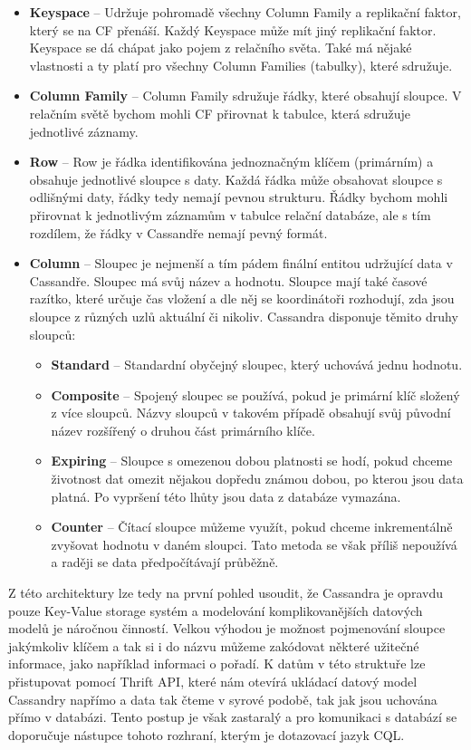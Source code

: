 \begin{itemize}
\item \textbf{Keyspace} – Udržuje pohromadě všechny Column Family a replikační faktor, který se na CF přenáší. Každý Keyspace může mít jiný replikační faktor. Keyspace se dá chápat jako pojem  z relačního světa. Také má nějaké vlastnosti a ty platí pro všechny Column Families (tabulky), které sdružuje.
\item \textbf{Column Family} – Column Family sdružuje řádky, které obsahují sloupce. V relačním světě bychom mohli CF přirovnat k tabulce, která sdružuje jednotlivé záznamy. 
\item \textbf{Row} – Row je řádka identifikována jednoznačným klíčem (primárním) a obsahuje jednotlivé sloupce s daty. Každá řádka může obsahovat sloupce s odlišnými daty, řádky tedy nemají pevnou strukturu. Řádky bychom mohli přirovnat k jednotlivým záznamům v tabulce relační databáze, ale s tím rozdílem, že řádky v Cassandře nemají pevný formát. 
\item \textbf{Column} – Sloupec je nejmenší a tím pádem finální entitou udržující data v Cassandře. Sloupec má svůj název a hodnotu. Sloupce mají také časové razítko, které určuje čas vložení a dle něj se koordinátoři rozhodují, zda jsou sloupce z různých uzlů aktuální či nikoliv. Cassandra disponuje těmito druhy sloupců:

\begin{itemize}
\item \textbf{Standard} – Standardní obyčejný sloupec, který uchovává jednu hodnotu.
\item \textbf{Composite} – Spojený sloupec se používá, pokud je primární klíč složený z více sloupců. Názvy sloupců v takovém případě obsahují svůj původní název rozšířený o druhou část primárního klíče. 
\item \textbf{Expiring} – Sloupce s omezenou dobou platnosti se hodí, pokud chceme životnost dat omezit nějakou dopředu známou dobou, po kterou jsou data platná. Po vypršení této lhůty jsou data z databáze vymazána.
\item \textbf{Counter} – Čítací sloupce můžeme využít, pokud chceme inkrementálně zvyšovat hodnotu v daném sloupci. Tato metoda se však příliš nepoužívá a raději se data předpočítávají průběžně. 
\end{itemize}
\end{itemize}



Z této architektury lze tedy na první pohled usoudit, že Cassandra je opravdu pouze Key-Value storage systém a modelování komplikovanějších datových modelů je náročnou činností. Velkou výhodou je možnost pojmenování sloupce jakýmkoliv klíčem a tak si i do názvu můžeme zakódovat některé užitečné informace, jako například informaci o pořadí. K datům v této struktuře lze přistupovat pomocí Thrift API, které nám otevírá ukládací datový model Cassandry napřímo a data tak čteme v syrové podobě, tak jak jsou uchována přímo v databázi. Tento postup je však zastaralý a pro komunikaci s databází se doporučuje nástupce tohoto rozhraní, kterým je dotazovací jazyk CQL. 


